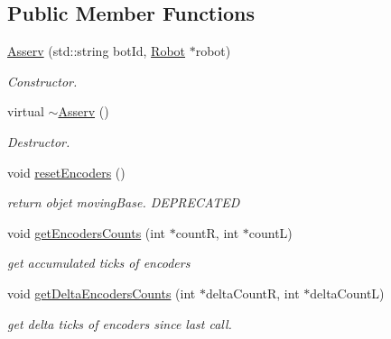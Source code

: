 \subsection*{Public Member Functions}
\begin{DoxyCompactItemize}
\item 
\mbox{\label{classAsserv_a9d22e7b9cfbf4bb95beb55d428e250dd}} 
\hyperlink{classAsserv_a9d22e7b9cfbf4bb95beb55d428e250dd}{Asserv} (std\+::string bot\+Id, \hyperlink{classRobot}{Robot} $\ast$robot)
\begin{DoxyCompactList}\small\item\em Constructor. \end{DoxyCompactList}\item 
\mbox{\label{classAsserv_a85403979795864168f24b708d12db02e}} 
virtual \hyperlink{classAsserv_a85403979795864168f24b708d12db02e}{$\sim$\+Asserv} ()
\begin{DoxyCompactList}\small\item\em Destructor. \end{DoxyCompactList}\item 
void \hyperlink{classAsserv_a888d98868d09718b55e15daecd8c6849}{reset\+Encoders} ()
\begin{DoxyCompactList}\small\item\em return objet moving\+Base. D\+E\+P\+R\+E\+C\+A\+T\+ED \end{DoxyCompactList}\item 
\mbox{\label{classAsserv_ad4598169af2eb414ac3f946a06e4b668}} 
void \hyperlink{classAsserv_ad4598169af2eb414ac3f946a06e4b668}{get\+Encoders\+Counts} (int $\ast$countR, int $\ast$countL)
\begin{DoxyCompactList}\small\item\em get accumulated ticks of encoders \end{DoxyCompactList}\item 
\mbox{\label{classAsserv_a93803a620c2137681911268d059b904d}} 
void \hyperlink{classAsserv_a93803a620c2137681911268d059b904d}{get\+Delta\+Encoders\+Counts} (int $\ast$delta\+CountR, int $\ast$delta\+CountL)
\begin{DoxyCompactList}\small\item\em get delta ticks of encoders since last call. \end{DoxyCompactList}\item 

\end{DoxyCompactItemize}
